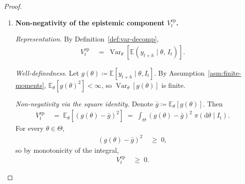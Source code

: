 \documentclass[12pt,openany]{book}
\newcommand{\calI}{\mathcal{I}}
\newcommand{\E}{\mathbb{E}}
\numberwithin{equation}{chapter}
\theoremstyle{plain}
\theoremstyle{definition}
\theoremstyle{remark}
\numberwithin{equation}{chapter}
\theoremstyle{plain}
\DeclareMathOperator{\Var}{Var}
\def\calI{I}%
\begin{document}
\begin{proof}
\begin{enumerate}
        \noindent\textit{Application of monotonicity.}
        By item~(1), the integrand satisfies
        \begin{align}
          \Var(y_{t+h} \mid \theta,\, \calI_t)
          &\;\geq\; 0
          \quad \pi\text{-a.s.}
          \label{eq:integrand-nonneg-al}
        \end{align}
        Monotonicity of the Lebesgue integral then gives
        \begin{align}
          V^{\mathrm{al}}_t
          &\;=\;
            \int_\Theta
              \Var(y_{t+h} \mid \theta,\, \calI_t)
            \;\pi(\mathrm{d}\theta \mid \calI_t)
          \;\geq\; \int_\Theta 0 \;\pi(\mathrm{d}\theta \mid \calI_t)
          \;=\; 0.
          \label{eq:Val-nonneg}
        \end{align}

        \noindent\textit{Edge case.}
        If $\Var(y_{t+h} \mid \theta, \calI_t) = 0$ for
        $\pi$-almost every $\theta$ (complete aleatoric
        certainty), then $V^{\mathrm{al}}_t = 0$; the inequality is
        satisfied with equality.  This concludes item~(2).

  \item \textbf{Non-negativity of the epistemic component
        $V^{\mathrm{ep}}_t$.}

        \noindent\textit{Representation.}
        By Definition~\ref{def:var-decomp},
        \begin{align}
          V^{\mathrm{ep}}_t
          &\;=\;
            \Var_\theta\!\left[
              \E(y_{t+h} \mid \theta,\, \calI_t)
            \right].
          \label{eq:Vep-repr}
        \end{align}

        \noindent\textit{Well-definedness.}
        Let $g(\theta) \coloneqq \E[y_{t+h} \mid \theta, \calI_t]$.
        By Assumption~\ref{asm:finite-moments},
        $\E_\theta[g(\theta)^2] < \infty$, so
        $\Var_\theta[g(\theta)]$ is finite.

        \noindent\textit{Non-negativity via the square identity.}
        Denote $\bar{g} \coloneqq \E_\theta[g(\theta)]$.  Then
        \begin{align}
          V^{\mathrm{ep}}_t
          &\;=\;
            \E_\theta\!\left[
              \left(g(\theta) - \bar{g}\right)^{\!2}
            \right]
          \;=\;
            \int_\Theta
              \left(g(\theta) - \bar{g}\right)^{\!2}
            \;\pi(\mathrm{d}\theta \mid \calI_t).
          \label{eq:Vep-sq}
        \end{align}
        For every $\theta \in \Theta$,
        \begin{align}
          \left(g(\theta) - \bar{g}\right)^{\!2}
          &\;\geq\; 0,
          \label{eq:Vep-integrand-nonneg}
        \end{align}
        so by monotonicity of the integral,
        \begin{align}
          V^{\mathrm{ep}}_t
          &\;\geq\; 0.
          \label{eq:Vep-nonneg}
        \end{align}


\end{enumerate}
\end{proof}
\end{document}
